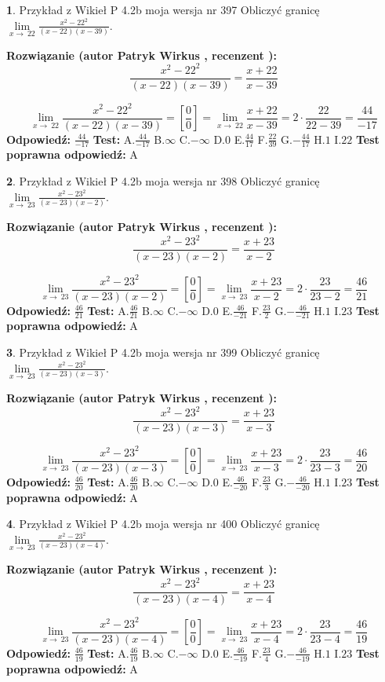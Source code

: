 \documentclass[12pt, a4paper]{article}
\theoremstyle{definition} %
\newtheorem{zad}{}
\newcommand{\zadStart}[1]{\begin{zad}#1\newline}
\newcommand{\zadStop}{\end{zad}}
\newcommand{\rozwStart}[2]{\noindent \textbf{Rozwiązanie (autor #1 , recenzent #2): }\newline}
\newcommand{\rozwStop}{\newline}
\newcommand{\odpStart}{\noindent \textbf{Odpowiedź:}\newline}
\newcommand{\odpStop}{\newline}
\newcommand{\testStart}{\noindent \textbf{Test:}\newline}
\newcommand{\testStop}{\newline}
\newcommand{\kluczStart}{\noindent \textbf{Test poprawna odpowiedź:}\newline}
\newcommand{\kluczStop}{\newline}
\begin{document}
\zadStart{Przykład z Wikieł P 4.2b moja wersja nr 397}
Obliczyć granicę $\lim\limits_{x\to\ 22}\frac{x^{2}-22^{2}}{(x-22)(x-39)}$.
\zadStop
\rozwStart{Patryk Wirkus}{}
$$\frac{x^{2}-22^{2}}{(x-22)(x-39)}=\frac{x+22}{x-39}$$

$$\lim\limits_{x\to\ 22}\frac{x^{2}-22^{2}}{(x-22)(x-39)}=[\frac{0}{0}]=\lim\limits_{x\to\ 22}\frac{x+22}{x-39}=2 \cdot \frac{22}{22-39} = \frac{44}{-17}$$
\rozwStop
\odpStart
$\frac{44}{-17}$
\odpStop
\testStart
A.$\frac{44}{-17}$
B.$\infty$
C.$-\infty$
D.$0$
E.$\frac{44}{17}$
F.$\frac{22}{39}$
G.$-\frac{44}{17}$
H.$1$
I.$22$
\testStop
\kluczStart
A
\kluczStop



\zadStart{Przykład z Wikieł P 4.2b moja wersja nr 398}
Obliczyć granicę $\lim\limits_{x\to\ 23}\frac{x^{2}-23^{2}}{(x-23)(x-2)}$.
\zadStop
\rozwStart{Patryk Wirkus}{}
$$\frac{x^{2}-23^{2}}{(x-23)(x-2)}=\frac{x+23}{x-2}$$

$$\lim\limits_{x\to\ 23}\frac{x^{2}-23^{2}}{(x-23)(x-2)}=[\frac{0}{0}]=\lim\limits_{x\to\ 23}\frac{x+23}{x-2}=2 \cdot \frac{23}{23-2} = \frac{46}{21}$$
\rozwStop
\odpStart
$\frac{46}{21}$
\odpStop
\testStart
A.$\frac{46}{21}$
B.$\infty$
C.$-\infty$
D.$0$
E.$\frac{46}{-21}$
F.$\frac{23}{2}$
G.$-\frac{46}{-21}$
H.$1$
I.$23$
\testStop
\kluczStart
A
\kluczStop



\zadStart{Przykład z Wikieł P 4.2b moja wersja nr 399}
Obliczyć granicę $\lim\limits_{x\to\ 23}\frac{x^{2}-23^{2}}{(x-23)(x-3)}$.
\zadStop
\rozwStart{Patryk Wirkus}{}
$$\frac{x^{2}-23^{2}}{(x-23)(x-3)}=\frac{x+23}{x-3}$$

$$\lim\limits_{x\to\ 23}\frac{x^{2}-23^{2}}{(x-23)(x-3)}=[\frac{0}{0}]=\lim\limits_{x\to\ 23}\frac{x+23}{x-3}=2 \cdot \frac{23}{23-3} = \frac{46}{20}$$
\rozwStop
\odpStart
$\frac{46}{20}$
\odpStop
\testStart
A.$\frac{46}{20}$
B.$\infty$
C.$-\infty$
D.$0$
E.$\frac{46}{-20}$
F.$\frac{23}{3}$
G.$-\frac{46}{-20}$
H.$1$
I.$23$
\testStop
\kluczStart
A
\kluczStop



\zadStart{Przykład z Wikieł P 4.2b moja wersja nr 400}
Obliczyć granicę $\lim\limits_{x\to\ 23}\frac{x^{2}-23^{2}}{(x-23)(x-4)}$.
\zadStop
\rozwStart{Patryk Wirkus}{}
$$\frac{x^{2}-23^{2}}{(x-23)(x-4)}=\frac{x+23}{x-4}$$

$$\lim\limits_{x\to\ 23}\frac{x^{2}-23^{2}}{(x-23)(x-4)}=[\frac{0}{0}]=\lim\limits_{x\to\ 23}\frac{x+23}{x-4}=2 \cdot \frac{23}{23-4} = \frac{46}{19}$$
\rozwStop
\odpStart
$\frac{46}{19}$
\odpStop
\testStart
A.$\frac{46}{19}$
B.$\infty$
C.$-\infty$
D.$0$
E.$\frac{46}{-19}$
F.$\frac{23}{4}$
G.$-\frac{46}{-19}$
H.$1$
I.$23$
\testStop
\kluczStart
A
\kluczStop
\end{document}
